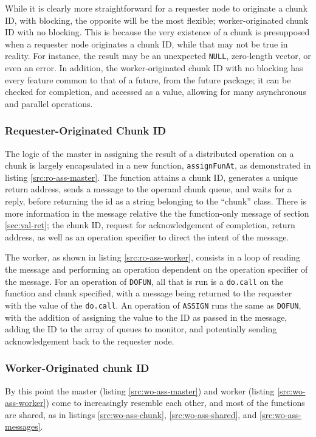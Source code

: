 \documentclass[a4paper,10pt]{article}
\begin{document}
While it is clearly more straightforward for a requester node to originate a
chunk ID, with blocking, the opposite will be the most flexible; worker-originated
chunk ID with no blocking.
This is because the very existence of a chunk is presupposed when a requester
node originates a chunk ID, while that may not be true in reality.
For instance, the result may be an unexpected \texttt{NULL}, zero-length
vector, or even an error.
In addition, the worker-originated chunk ID with no blocking has every feature
common to that of a future, from the future package; it can be checked for
completion, and accessed as a value, allowing for many asynchronous and
parallel operations.

\subsubsection{Requester-Originated Chunk ID}

The logic of the master in assigning the result of a distributed operation on a
chunk is largely encapsulated in a new function, \texttt{assignFunAt}, as
demonstrated in listing \ref{src:ro-ass-master}.
The function attains a chunk ID, generates a unique return address, sends a
message to the operand chunk queue, and waits for a reply, before returning the
id as a string belonging to the ``chunk'' class.
There is more information in the message relative the the function-only
message of section \ref{sec:val-ret}; the chunk ID, request for acknowledgement
of completion, return address, as well as an operation specifier to direct the
intent of the message.

The worker, as shown in listing \ref{src:ro-ass-worker}, consists in a loop of
reading the message and performing an operation dependent on the operation
specifier of the message.
For an operation of \texttt{DOFUN}, all that is run is a \texttt{do.call} on
the function and chunk specified, with a message being returned to the
requester with the value of the \texttt{do.call}.
An operation of \texttt{ASSIGN} runs the same as \texttt{DOFUN}, with the
addition of assigning the value to the ID as passed in the message, adding
the ID to the array of queues to monitor, and potentially sending
acknowledgement back to the requester node.

\subsubsection{Worker-Originated chunk ID}

By this point the master (listing \ref{src:wo-ass-master}) and worker (listing
\ref{src:wo-ass-worker}) come to increasingly resemble each other, and most of
the functions are shared, as in listings \ref{src:wo-ass-chunk},
\ref{src:wo-ass-shared}, and \ref{src:wo-ass-messages}.
\end{document}
